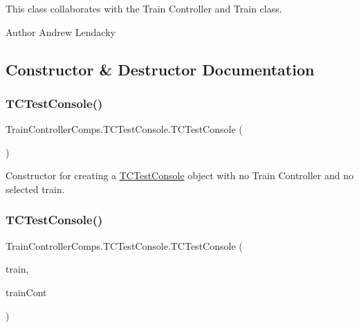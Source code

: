 This class collaborates with the Train Controller and Train class.

\begin{DoxyAuthor}{Author}
Andrew Lendacky 
\end{DoxyAuthor}


\subsection{Constructor \& Destructor Documentation}
\mbox{\label{classTrainControllerComps_1_1TCTestConsole_a760b79fd912301b36a19c372eafc1616}} 
\subsubsection{\texorpdfstring{T\+C\+Test\+Console()}{TCTestConsole()}\hspace{0.1cm}{\footnotesize\ttfamily [1/2]}}
{\footnotesize\ttfamily Train\+Controller\+Comps.\+T\+C\+Test\+Console.\+T\+C\+Test\+Console (\begin{DoxyParamCaption}{ }\end{DoxyParamCaption})}



Constructor for creating a \hyperlink{classTrainControllerComps_1_1TCTestConsole}{T\+C\+Test\+Console} object with no Train Controller and no selected train. 

\mbox{\label{classTrainControllerComps_1_1TCTestConsole_acb9494e195e57188bc7150aa96faef80}} 
\subsubsection{\texorpdfstring{T\+C\+Test\+Console()}{TCTestConsole()}\hspace{0.1cm}{\footnotesize\ttfamily [2/2]}}
{\footnotesize\ttfamily Train\+Controller\+Comps.\+T\+C\+Test\+Console.\+T\+C\+Test\+Console (\begin{DoxyParamCaption}\item[{\hyperlink{classTrainControllerComps_1_1TestTrain}{Test\+Train}}]{train,  }\item[{\hyperlink{classTrainControllerComps_1_1TrainController}{Train\+Controller}}]{train\+Cont }\end{DoxyParamCaption})}



